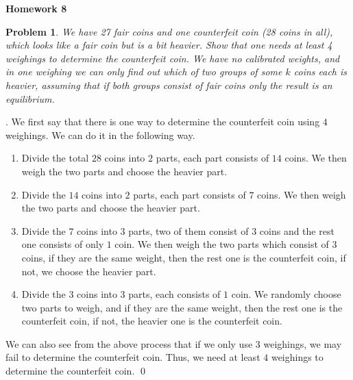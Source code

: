 \documentclass[12pt]{article}
\date{Feb 14, 2012}
\newtheorem{hw}{Problem}
\newenvironment{sol}
  {\par\vspace{3mm}\noindent{\it Solution}.}
  {\qed}
\begin{document}
\begin{center}
{\LARGE\bf Homework 8}\\
\vspace{2mm}
\end{center}

\begin{hw}
We have 27 fair coins and one counterfeit coin (28 coins in all), which looks like a fair coin but is a bit heavier. Show that one needs at least 4 weighings to determine the counterfeit coin. We have no calibrated weights, and in one weighing we can only find out which of two groups of some $k$ coins each is heavier, assuming that if both groups consist of fair coins only the result is an equilibrium.
\end{hw}
\begin{sol}
	We first say that there is one way to determine the counterfeit coin using $4$ weighings. We can do it in the following way.
	\begin{enumerate}
		\item Divide the total $28$ coins into $2$ parts, each part consists of $14$ coins. We then weigh the two parts and choose the heavier part.
		
		\item Divide the $14$ coins into $2$ parts, each part consists of $7$ coins. We then weigh the two parts and choose the heavier part.
		
		\item Divide the $7$ coins into $3$ parts, two of them consist of $3$ coins and the rest one consists of only $1$ coin. We then weigh the two parts which consist of $3$ coins, if they are the same weight, then the rest one is the counterfeit coin, if not, we choose the heavier part.
		
		\item  Divide the $3$ coins into $3$ parts, each consists of $1$ coin. We randomly choose two parts to weigh, and if they are the same weight, then the rest one is the counterfeit coin, if not, the heavier one is the counterfeit coin.
	\end{enumerate}
	We can also see from the above process that if we only use $3$ weighings, we may fail to determine the counterfeit coin. Thus, we need at least $4$ weighings to determine the counterfeit coin.
\end{sol}
\end{document}
